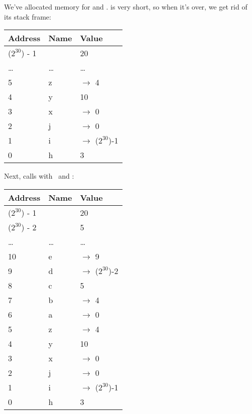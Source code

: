 We've allocated memory for  and .  is very short, so when it's over, we get rid of its stack frame:

\begin{table}[H]
  \begin{tabular}{|l|l|l|}
    \hline
    \textbf{Address} & \textbf{Name} & \textbf{Value} \\
    \hline
    ($2^{30}$) - 1 & & 20 \\
    \hline
    \ldots & \ldots & \ldots \\
    \hline
    5 & z & $\rightarrow$ 4 \\
    \hline
    4 & y & 10 \\
    \hline
    3 & x & $\rightarrow$ 0 \\
    \hline
    2 & j & $\rightarrow$ 0 \\
    \hline
    1 & i & $\rightarrow$ ($2^{30}$)-1 \\
    \hline
    0 & h & 3 \\
    \hline
  \end{tabular}
\end{table}

Next,  calls  with \x\ and \z:

\begin{table}[H]
  \begin{tabular}{|l|l|l|}
    \hline
    \textbf{Address} & \textbf{Name} & \textbf{Value} \\
    \hline
    ($2^{30}$) - 1 & & 20 \\
    \hline
    ($2^{30}$) - 2 & & 5 \\
    \hline
    \hline
    \ldots & \ldots & \ldots \\
    \hline
    10 & e & $\rightarrow$ 9 \\
    \hline
    9 & d & $\rightarrow$ ($2^{30}$)-2 \\
    \hline
    8 & c & 5 \\
    \hline
    7 & b & $\rightarrow$ 4 \\
    \hline
    6 & a & $\rightarrow$ 0 \\
    \hline
    5 & z & $\rightarrow$ 4 \\
    \hline
    4 & y & 10 \\
    \hline
    3 & x & $\rightarrow$ 0 \\
    \hline
    2 & j & $\rightarrow$ 0 \\
    \hline
    1 & i & $\rightarrow$ ($2^{30}$)-1 \\
    \hline
    0 & h & 3 \\
    \hline
  \end{tabular}
\end{table}

